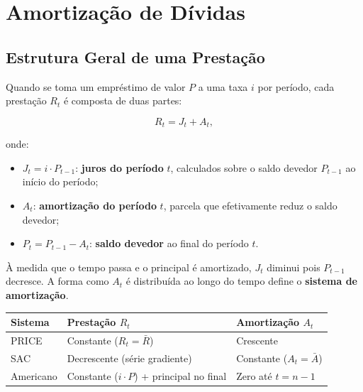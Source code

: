 
\chapter{Amortização de Dívidas}

\section{Estrutura Geral de uma Prestação}

Quando se toma um empréstimo de valor $P$ a uma taxa $i$ por período, cada prestação $R_t$
é composta de duas partes:

\begin{resultado}
\[
  R_t = J_t + A_t,
\]
\end{resultado}

onde:
\begin{itemize}
  \item $J_t = i \cdot P_{t-1}$: \textbf{juros do período} $t$, calculados sobre o saldo devedor
    $P_{t-1}$ ao início do período;
  \item $A_t$: \textbf{amortização do período} $t$, parcela que efetivamente reduz o saldo devedor;
  \item $P_t = P_{t-1} - A_t$: \textbf{saldo devedor} ao final do período $t$.
\end{itemize}

À medida que o tempo passa e o principal é amortizado, $J_t$ diminui pois $P_{t-1}$ decresce.
A forma como $A_t$ é distribuída ao longo do tempo define o \textbf{sistema de amortização}.

\begin{center}
\renewcommand{\arraystretch}{1.3}
\begin{tabular}{lll}
\toprule
\textbf{Sistema} & \textbf{Prestação $R_t$} & \textbf{Amortização $A_t$} \\
\midrule
PRICE  & Constante ($R_t = \bar{R}$)  & Crescente \\
SAC    & Decrescente (série gradiente) & Constante ($A_t = \bar{A}$) \\
Americano & Constante ($i\cdot P$) + principal no final & Zero até $t=n-1$ \\
\bottomrule
\end{tabular}
\end{center}

